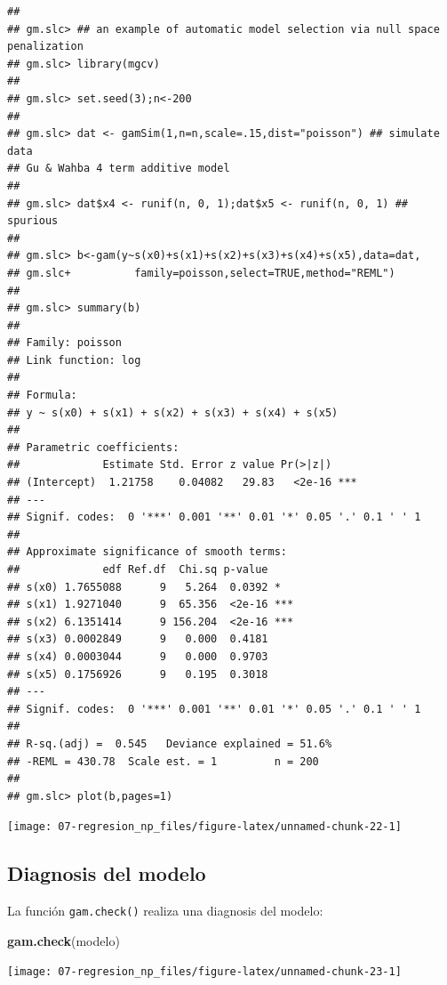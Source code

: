 \documentclass[
]{book}
\newenvironment{Shaded}{\begin{snugshade}}{\end{snugshade}}
\newcommand{\KeywordTok}[1]{\textcolor[rgb]{0.13,0.29,0.53}{\textbf{#1}}}
\newcommand{\NormalTok}[1]{#1}
\theoremstyle{break}
\theoremstyle{definition}
\theoremstyle{definition}
\theoremstyle{definition}
\theoremstyle{remark}
\begin{document}
\begin{verbatim}
## 
## gm.slc> ## an example of automatic model selection via null space penalization
## gm.slc> library(mgcv)
## 
## gm.slc> set.seed(3);n<-200
## 
## gm.slc> dat <- gamSim(1,n=n,scale=.15,dist="poisson") ## simulate data
## Gu & Wahba 4 term additive model
## 
## gm.slc> dat$x4 <- runif(n, 0, 1);dat$x5 <- runif(n, 0, 1) ## spurious
## 
## gm.slc> b<-gam(y~s(x0)+s(x1)+s(x2)+s(x3)+s(x4)+s(x5),data=dat,
## gm.slc+          family=poisson,select=TRUE,method="REML")
## 
## gm.slc> summary(b)
## 
## Family: poisson 
## Link function: log 
## 
## Formula:
## y ~ s(x0) + s(x1) + s(x2) + s(x3) + s(x4) + s(x5)
## 
## Parametric coefficients:
##             Estimate Std. Error z value Pr(>|z|)    
## (Intercept)  1.21758    0.04082   29.83   <2e-16 ***
## ---
## Signif. codes:  0 '***' 0.001 '**' 0.01 '*' 0.05 '.' 0.1 ' ' 1
## 
## Approximate significance of smooth terms:
##             edf Ref.df  Chi.sq p-value    
## s(x0) 1.7655088      9   5.264  0.0392 *  
## s(x1) 1.9271040      9  65.356  <2e-16 ***
## s(x2) 6.1351414      9 156.204  <2e-16 ***
## s(x3) 0.0002849      9   0.000  0.4181    
## s(x4) 0.0003044      9   0.000  0.9703    
## s(x5) 0.1756926      9   0.195  0.3018    
## ---
## Signif. codes:  0 '***' 0.001 '**' 0.01 '*' 0.05 '.' 0.1 ' ' 1
## 
## R-sq.(adj) =  0.545   Deviance explained = 51.6%
## -REML = 430.78  Scale est. = 1         n = 200
## 
## gm.slc> plot(b,pages=1)
\end{verbatim}

\begin{center}\texttt{[image: 07-regresion\_np\_files/figure-latex/unnamed-chunk-22-1]} \end{center}

\hypertarget{mgcv-diagnosis}{%
\subsection{Diagnosis del modelo}\label{mgcv-diagnosis}}

La función \texttt{gam.check()} realiza una diagnosis del modelo:

\begin{Shaded}
\begin{Highlighting}[]
\KeywordTok{gam.check}\NormalTok{(modelo)}
\end{Highlighting}
\end{Shaded}

\begin{center}\texttt{[image: 07-regresion\_np\_files/figure-latex/unnamed-chunk-23-1]} \end{center}
\end{document}
